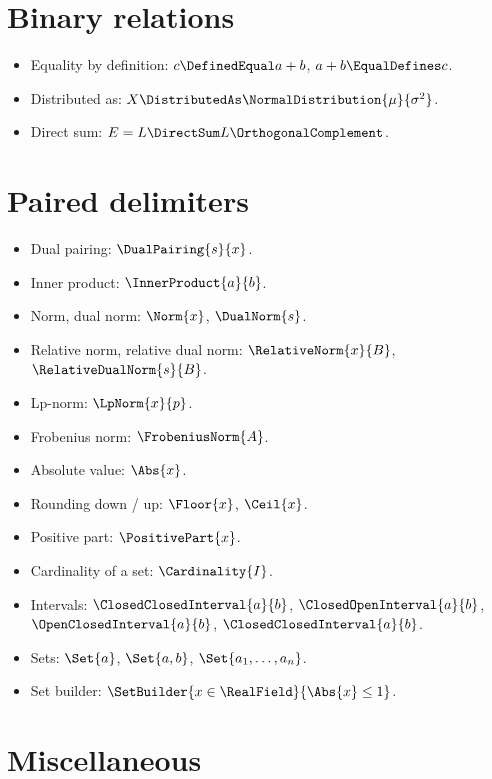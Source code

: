 \documentclass{article}
\begin{document}
  \section{Binary relations}

  \begin{itemize}
    \item Equality by definition: $c \DefinedEqual a + b$, $a + b \EqualDefines c$.
    \item Distributed as: $X \DistributedAs \NormalDistribution{\mu}{\sigma^2}$.
    \item Direct sum: $E = L \DirectSum L\OrthogonalComplement$.
  \end{itemize}

  \section{Paired delimiters}

  \begin{itemize}
    \item Dual pairing: $\DualPairing{s}{x}$.
    \item Inner product: $\InnerProduct{a}{b}$.
    \item Norm, dual norm: $\Norm{x}$, $\DualNorm{s}$.
    \item Relative norm, relative dual norm: $\RelativeNorm{x}{B}$, $\RelativeDualNorm{s}{B}$.
    \item Lp-norm: $\LpNorm{x}{p}$.
    \item Frobenius norm: $\FrobeniusNorm{A}$.
    \item Absolute value: $\Abs{x}$.
    \item Rounding down / up: $\Floor{x}$, $\Ceil{x}$.
    \item Positive part: $\PositivePart{x}$.
    \item Cardinality of a set: $\Cardinality{I}$.
    \item Intervals: $\ClosedClosedInterval{a}{b}$, $\ClosedOpenInterval{a}{b}$, $\OpenClosedInterval{a}{b}$,
    $\ClosedClosedInterval{a}{b}$.
    \item Sets: $\Set{a}$, $\Set{a, b}$, $\Set{a_1, \dots, a_n}$.
    \item Set builder: $\SetBuilder{x \in \RealField}{\Abs{x} \leq 1}$.
  \end{itemize}

  \section{Miscellaneous}
\end{document}
